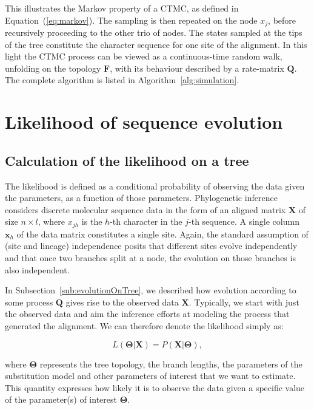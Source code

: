 This illustrates the Markov property of a CTMC, as defined in Equation~(\ref{eq:markov}).
The sampling is then repeated on the node $x_j$, before recursively proceeding to the other trio of nodes.
The states sampled at the tips of the tree constitute the character sequence for one site of the alignment.
In this light the CTMC process can be viewed as a continuous-time random walk, unfolding on the topology $\mathbf{F}$, with its behaviour described by a rate-matrix $\mathbf{Q}$.
The complete algorithm is listed in Algorithm~\ref{alg:simulation}.

\section{Likelihood of sequence evolution}

\subsection{Calculation of the likelihood on a tree\label{sub:likelihood}}

The likelihood is defined as a conditional probability of observing the data given the parameters, as a function of those parameters.
Phylogenetic inference considers discrete molecular sequence data in the form of an aligned matrix $\mathbf{X}$ of size $n \times l$, where $x_{jh}$ is the $h$-th character in the $j$-th sequence.
A single column $\mathbf{x}_{h}$ of the data matrix constitutes a single site.
Again, the standard assumption of (site and lineage) independence posits that different sites evolve independently and that once two branches split at a node, the evolution on those branches is also independent.

In Subsection~\ref{sub:evolutionOnTree}, we described how evolution according to some process $\mathbf{Q}$ gives rise to the observed data $\mathbf{X}$.
Typically, we start with just the observed data and aim the inference efforts at modeling the process that generated the alignment.
We can therefore denote the likelihood simply as: 

\begin{equation}
L\left(\mathbf{\Theta}|\mathbf{X}\right)=P\left( \mathbf{X} | \mathbf{\Theta} \right), 
\label{eq:likelihood}
\end{equation}

\noindent
where $\mathbf{\Theta}$ represents the tree topology, the branch lengths, the parameters of the substitution model and other parameters of interest that we want to estimate.
This quantity expresses how likely it is to observe the data given a specific value of the parameter(s) of interest $\mathbf{\Theta}$.

